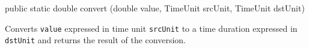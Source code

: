 \begin{code}

   public static double convert (double value, TimeUnit srcUnit,
                                 TimeUnit dstUnit)\begin{hide} {
      double hours = value*srcUnit.getHours();
      return hours/dstUnit.getHours();
   }
}\end{hide}
\end{code}
\begin{tabb}   Converts \texttt{value} expressed in time unit \texttt{srcUnit} to
 a time duration expressed in \texttt{dstUnit} and returns
 the result of the conversion.
\end{tabb}
\begin{htmlonly}
\end{htmlonly}
